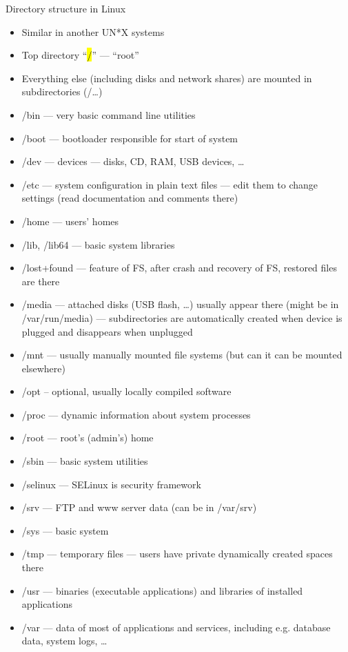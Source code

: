 \documentclass[compress, ucs, xelatex, 11pt, xcolor=svgnames,
  hyperref={
    bookmarks=true,
    unicode=true,
    colorlinks=true,
    pdftitle={Linux, command line and MetaCentrum},
    plainpages=false,
    pdfauthor={Vojtech Zeisek},
    pdfsubject={Course about use of Linux command line, writing shell scripts and using MetaCentrum of CESNET},
    pdfcreator={XeLaTeX, http://www.xelatex.org/},
    pdfkeywords={Linux, GNU, BASH, shell, command line, MetaCentrum},
    linkcolor=Sienna,
    anchorcolor=black,
    citecolor=green,
    filecolor=magenta,
    menucolor=Sienna,
    urlcolor=cyan,
    pdftex},
  url={hyphens, lowtilde} %
  ]{beamer}
\renewcommand{\texttt}[1]{\hl{\ttfamily #1}}
\begin{document}
\begin{frame}[allowframebreaks]{Directory structure in Linux}
\begin{itemize}
  \item Similar in another UN*X systems
  \item Top directory ``\texttt{/}'' --- ``root''
  \item Everything else (including disks and network shares) are mounted in subdirectories (/\ldots)
  \item /bin --- very basic command line utilities
  \item /boot --- bootloader responsible for start of system
  \item /dev --- devices --- disks, CD, RAM, USB devices, \ldots
  \item \alert{/etc} --- system configuration in plain text files --- edit them to change settings (read documentation and comments there)
  \item \alert{/home} --- users' homes
  \item /lib, /lib64 --- basic system libraries
  \item /lost+found --- feature of FS, after crash and recovery of FS, restored files are there
  \item \alert{/media} --- attached disks (USB flash, \ldots) usually appear there (might be in /var/run/media) --- subdirectories are automatically created when device is plugged and disappears when unplugged
  \item /mnt --- usually manually mounted file systems (but can it can be mounted elsewhere)
  \item /opt -- optional, usually locally compiled software
  \item /proc --- dynamic information about system processes
  \item /root --- root's (admin's) home
  \item /sbin --- basic system utilities
  \item /selinux --- SELinux is security framework
  \item /srv --- FTP and www server data (can be in /var/srv)
  \item /sys --- basic system
  \item /tmp --- temporary files --- users have private dynamically created spaces there
  \item /usr --- binaries (executable applications) and libraries of installed applications
  \item \alert{/var} --- data of most of applications and services, including e.g. database data, system logs, \ldots

\end{itemize}
\end{frame}
\end{document}
